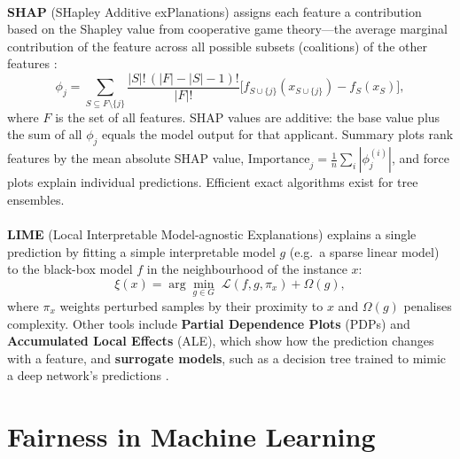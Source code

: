 \documentclass[12pt,a4paper,final]{extreport}
\begin{document}
\paragraph{} \textbf{SHAP} (SHapley Additive exPlanations) \cite{lundberg2017} assigns each feature a contribution based on the Shapley value from cooperative game theory---the average marginal contribution of the feature across all possible subsets (coalitions) of the other features \cite{p3}:
\begin{equation}
\phi_j=\sum_{S\subseteq F\setminus\{j\}}\frac{|S|!\,(|F|-|S|-1)!}{|F|!}\Big[f_{S\cup\{j\}}(x_{S\cup\{j\}})-f_S(x_S)\Big],
\label{eq:shap}
\end{equation}
where $F$ is the set of all features. SHAP values are additive: the base value plus the sum of all $\phi_j$ equals the model output for that applicant. Summary plots rank features by the mean absolute SHAP value, $\mathrm{Importance}_j=\frac{1}{n}\sum_i|\phi_j^{(i)}|$, and force plots explain individual predictions. Efficient exact algorithms exist for tree ensembles.

\paragraph{} \textbf{LIME} (Local Interpretable Model-agnostic Explanations) \cite{ribeiro2016} explains a single prediction by fitting a simple interpretable model $g$ (e.g.\ a sparse linear model) to the black-box model $f$ in the neighbourhood of the instance $x$:
\begin{equation}
\xi(x)=\arg\min_{g\in G}\;\mathcal{L}(f,g,\pi_x)+\Omega(g),
\end{equation}
where $\pi_x$ weights perturbed samples by their proximity to $x$ and $\Omega(g)$ penalises complexity. Other tools include \textbf{Partial Dependence Plots} (PDPs) and \textbf{Accumulated Local Effects} (ALE), which show how the prediction changes with a feature, and \textbf{surrogate models}, such as a decision tree trained to mimic a deep network's predictions \cite{p1,p4}.

\section{Fairness in Machine Learning}
\end{document}
